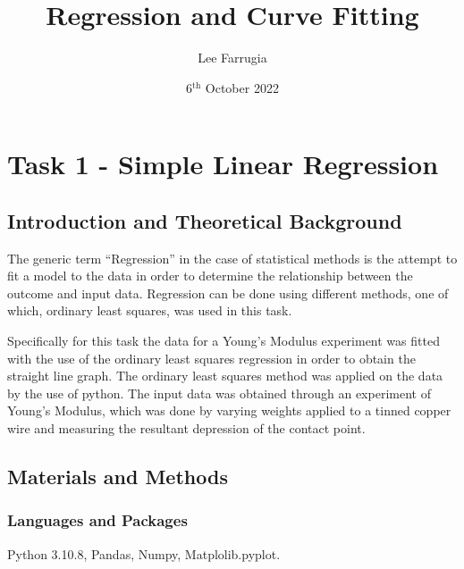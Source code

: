 \documentclass[12pt, a4paper]{article}
\title{Regression and Curve Fitting}
\date{6\(^\text{{th}}\) October 2022}
\author{Lee Farrugia}
\begin{document}
    
\maketitle
\thispagestyle{titlepagestyle}
\pagestyle{mystyle}

\section{Task 1 - Simple Linear Regression}

\subsection{Introduction and Theoretical Background}
The generic term ``Regression'' in the case of statistical methods is the attempt to fit a model to the data in order to determine the relationship between the outcome and input data. Regression can be done using different methods, one of which, ordinary least squares, was used in this task.

Specifically for this task the data for a Young's Modulus experiment was fitted with the use of the ordinary least squares regression in order to obtain the straight line graph. The ordinary least squares method was applied on the data by the use of python. The input data was obtained through an experiment of Young's Modulus, which was done by varying weights applied to a tinned copper wire and measuring the resultant depression of the contact point.

\subsection{Materials and Methods}

\subsubsection{Languages and Packages}
Python 3.10.8, Pandas, Numpy, Matplolib.pyplot.
\end{document}
